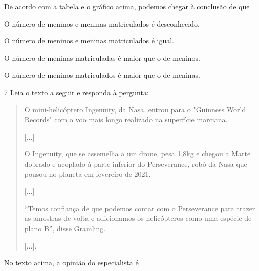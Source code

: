 De acordo com a tabela e o gráfico acima, podemos chegar à conclusão de
que

\begin{escolha}
\item O número de meninos e meninas matriculados é desconhecido.

\item O número de meninos e meninas matriculados é igual.

\item O número de meninas matriculadas é maior que o de meninos.

\item O número de meninos matriculados é maior que o de meninas.
\end{escolha}


\num{7} Leia o texto a seguir e responda à pergunta:

\begin{quote}
O mini-helicóptero Ingenuity, da Nasa, entrou para o "Guinness World
Records" com o voo mais longo realizado na superfície marciana.

{[}...{]}

O Ingenuity, que se assemelha a um drone, pesa 1,8kg e chegou a Marte
dobrado e acoplado à parte inferior do Perseverance, robô da Nasa que
pousou no planeta em fevereiro de 2021.

{[}...{]}

``Temos confiança de que podemos contar com o Perseverance para trazer
as amostras de volta e adicionamos os helicópteros como uma espécie de
plano B'', disse Gramling.

{[}...{]}.

\end{quote}

No texto acima, a opinião do especialista é

